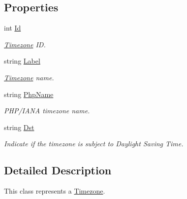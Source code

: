 \subsection*{Properties}
\begin{DoxyCompactItemize}
\item 
int \hyperlink{class_thecallr_api_1_1_objects_1_1_misc_1_1_timezone_ab9adc22c5aa360444e0fb49ec606f3d8}{Id}
\begin{DoxyCompactList}\small\item\em \hyperlink{class_thecallr_api_1_1_objects_1_1_misc_1_1_timezone}{Timezone} I\+D. \end{DoxyCompactList}\item 
string \hyperlink{class_thecallr_api_1_1_objects_1_1_misc_1_1_timezone_a1583c475af1c82150d387bff9ba98edb}{Label}
\begin{DoxyCompactList}\small\item\em \hyperlink{class_thecallr_api_1_1_objects_1_1_misc_1_1_timezone}{Timezone} name. \end{DoxyCompactList}\item 
string \hyperlink{class_thecallr_api_1_1_objects_1_1_misc_1_1_timezone_ad8396fddbcc1b25bdf8bf4627c20fe4b}{Php\+Name}
\begin{DoxyCompactList}\small\item\em P\+H\+P/\+I\+A\+N\+A timezone name. \end{DoxyCompactList}\item 
string \hyperlink{class_thecallr_api_1_1_objects_1_1_misc_1_1_timezone_ae3e2f8b72e80f993d35e7c6772d9b14b}{Dst}
\begin{DoxyCompactList}\small\item\em Indicate if the timezone is subject to Daylight Saving Time. \end{DoxyCompactList}\end{DoxyCompactItemize}


\subsection{Detailed Description}
This class represents a \hyperlink{class_thecallr_api_1_1_objects_1_1_misc_1_1_timezone}{Timezone}. 



